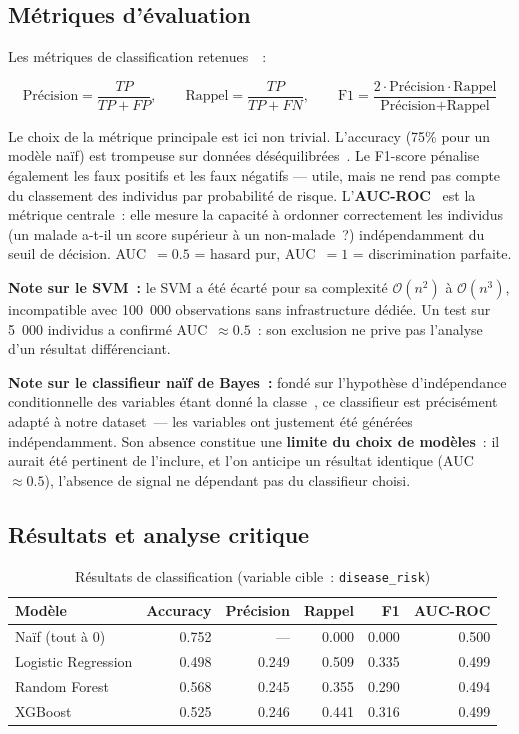 \subsection{Métriques d'évaluation}

Les métriques de classification retenues~\cite{sokolova2009}~:

\begin{equation}
\text{Précision} = \frac{TP}{TP+FP}, \qquad \text{Rappel} = \frac{TP}{TP+FN}, \qquad
\text{F1} = \frac{2 \cdot \text{Précision} \cdot \text{Rappel}}{\text{Précision} + \text{Rappel}}
\end{equation}

Le choix de la métrique principale est ici non trivial. L'accuracy (75\% pour un modèle naïf) est trompeuse sur données déséquilibrées~\cite{japkowicz2002}. Le F1-score pénalise également les faux positifs et les faux négatifs --- utile, mais ne rend pas compte du classement des individus par probabilité de risque. L'\textbf{AUC-ROC}~\cite{james2021} est la métrique centrale~: elle mesure la capacité à ordonner correctement les individus (un malade a-t-il un score supérieur à un non-malade~?) indépendamment du seuil de décision. AUC~$= 0.5$ = hasard pur, AUC~$= 1$ = discrimination parfaite.

\textbf{Note sur le SVM~:} le SVM a été écarté pour sa complexité $\mathcal{O}(n^2)$ à $\mathcal{O}(n^3)$, incompatible avec 100~000 observations sans infrastructure dédiée. Un test sur 5~000 individus a confirmé AUC~$\approx 0.5$~: son exclusion ne prive pas l'analyse d'un résultat différenciant.

\textbf{Note sur le classifieur naïf de Bayes~:} fondé sur l'hypothèse d'indépendance conditionnelle des variables étant donné la classe~\cite{james2021}, ce classifieur est précisément adapté à notre dataset~--- les variables ont justement été générées indépendamment. Son absence constitue une \textbf{limite du choix de modèles}~: il aurait été pertinent de l'inclure, et l'on anticipe un résultat identique (AUC~$\approx 0.5$), l'absence de signal ne dépendant pas du classifieur choisi.

\subsection{Résultats et analyse critique}

\begin{table}[H]
\centering
\caption{Résultats de classification (variable cible~: \texttt{disease\_risk})}
\label{tab:classif_results}
\begin{tabular}{lrrrrr}
\toprule
Modèle & Accuracy & Précision & Rappel & F1 & AUC-ROC \\
\midrule
Naïf (tout à 0)      & 0.752 & ---   & 0.000 & 0.000 & 0.500 \\
Logistic Regression  & 0.498 & 0.249 & 0.509 & 0.335 & 0.499 \\
Random Forest        & 0.568 & 0.245 & 0.355 & 0.290 & 0.494 \\
XGBoost              & 0.525 & 0.246 & 0.441 & 0.316 & 0.499 \\
\bottomrule
\end{tabular}
\end{table}

